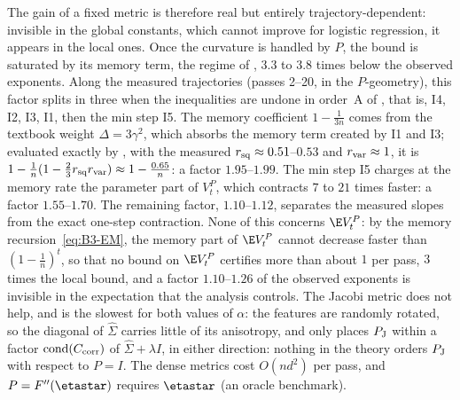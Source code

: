 The gain of a fixed metric is therefore real but entirely trajectory-dependent: invisible in the global constants, which
cannot improve for logistic regression, it appears in the local ones. Once the curvature is handled by $P$, the bound is
saturated by its memory term, the regime of , $3.3$ to $3.8$ times below the observed
exponents. Along the measured trajectories (passes 2--20, in the $P$-geometry), this factor splits in three when the
inequalities are undone in order~A of , that is, I4, I2, I3, I1, then the min step I5. The memory
coefficient $1-\frac1{3n}$ comes from the textbook weight $\Delta=3\gamma^2$, which absorbs the memory term created by I1
and I3; evaluated exactly by , with the measured $r_{\rm sq}\approx0.51$--$0.53$ and
$r_{\rm var}\approx1$, it is $1-\frac1n(1-\frac23r_{\rm sq}r_{\rm var})\approx1-\frac{0.65}n$: a factor $1.95$--$1.99$.
The min step I5 charges at the memory rate the parameter part of $V_t^P$, which contracts $7$ to $21$ times faster: a
factor $1.55$--$1.70$. The remaining factor, $1.10$--$1.12$, separates the measured slopes from the exact one-step
contraction. None of this concerns $\E V_t^P$: by the memory recursion~\eqref{eq:B3-EM}, the memory part of $\E V_t^P$
cannot decrease faster than $(1-\frac1n)^t$, so that no bound on $\E V_t^P$ certifies more than about $1$ per pass, $3$
times the local bound, and a factor $1.10$--$1.26$ of the observed exponents is invisible in the expectation that the
analysis controls. The Jacobi metric does not help, and is the slowest for both values of $\alpha$: the features are
randomly rotated, so the diagonal of $\hat\Sigma$ carries little of its anisotropy, and  only places
$P_{\rm J}$ within a factor $\operatorname{cond}(C_{\rm corr})$ of $\hat\Sigma+\lambda I$, in either direction: nothing in
the theory orders $P_{\rm J}$ with respect to $P=I$. The dense metrics cost $O(nd^2)$ per pass, and $P=F''(\etastar)$
requires $\etastar$ (an oracle benchmark).

